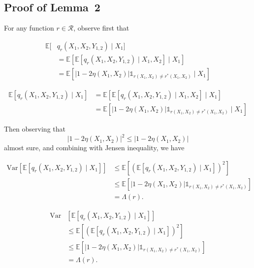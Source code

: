 \documentclass[letterpaper]{article} %
\def\DoubleColumn{}
\def\DoubleColumnEnd{}
\def\SingleColumn{}
\def\SingleColumnEnd{}
\newcommand{\E}{\mathbb{E}}
\newcommand{\Var}{\text{Var}}
\newcommand{\indicator}{\mathds 1}
\begin{document}
\subsection{Proof of Lemma~2} %
\label{sub:proofs_of_main_track}
    For any function $r\in\mathcal{R}$, observe first that
    \DoubleColumn
    \begin{align*}
        \E[&q_r(X_1,X_2,Y_{1,2})\mid X_1]\\
        &= \E[\E[q_r(X_1,X_2,Y_{1,2})\mid X_1,X_2]\mid X_1]\\
        &= \E[|1-2\eta(X_1,X_2)|\indicator{}_{r(X_1,X_2)\neq r^*(X_1,X_2)}\mid X_1]
    \end{align*}
    \DoubleColumnEnd
    \SingleColumn
    \begin{align*}
        \E[q_r(X_1,X_2,Y_{1,2})\mid X_1]&= \E[\E[q_r(X_1,X_2,Y_{1,2})\mid X_1,X_2]\mid X_1]\\
        &= \E[|1-2\eta(X_1,X_2)|\indicator{}_{r(X_1,X_2)\neq r^*(X_1,X_2)}\mid X_1]
    \end{align*}
    \SingleColumnEnd
    Then observing that
    \[|1-2\eta(X_1,X_2)|^2\le |1-2\eta(X_1,X_2)|\]
    almost sure, and combining with Jensen inequality, we have
    \SingleColumn
    \begin{align*}
        \Var[\E[q_r(X_1,X_2,Y_{1,2})\mid X_1]] & \le \E[(\E[q_r(X_1,X_2,Y_{1,2})\mid X_1])^2]\\
        &\le \E[|1-2\eta(X_1,X_2)|\indicator{}_{r(X_1,X_2)\neq r^*(X_1,X_2)}]\\
        &= \Lambda(r).
    \end{align*}
    \SingleColumnEnd
    \DoubleColumn
    \begin{align*}
        \Var&[\E[q_r(X_1,X_2,Y_{1,2})\mid X_1]] \\
        & \le \E[(\E[q_r(X_1,X_2,Y_{1,2})\mid X_1])^2]\\
        &\le \E[|1-2\eta(X_1,X_2)|\indicator{}_{r(X_1,X_2)\neq r^*(X_1,X_2)}]\\
        &= \Lambda(r).
    \end{align*}
    \DoubleColumnEnd
\end{document}

